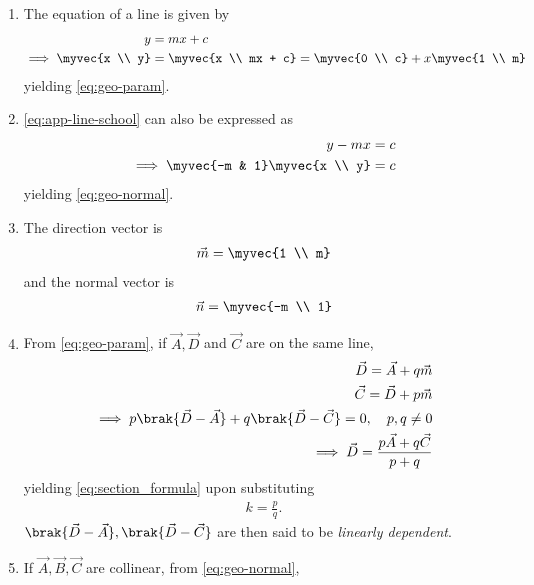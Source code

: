 \begin{enumerate}[label=\thesection.\arabic*.,ref=\thesection.\theenumi]
\item The equation of a line is given by 
\begin{align}
			\label{eq:app-line-school}
	y &= mx + c
	\\
	\implies \myvec{x \\ y} &= \myvec{x \\ 
	 mx + c} =\myvec{0 \\ c} + x\myvec{1 \\ m}
\end{align}
			yielding \eqref{eq:geo-param}.
\item 			\eqref{eq:app-line-school} can also be expressed as
\begin{align}
	y - mx &= c 
	\\
	\implies \myvec{-m & 1}\myvec{x \\ y} &= c
\end{align}
			yielding \eqref{eq:geo-normal}.
		\item The direction vector is 
\begin{align}
			\label{eq:app-line-school-dir}
\vec{m} = \myvec{1 \\ m}
\end{align}
and the normal vector is
\begin{align}
\vec{n}=\myvec{-m \\ 1}
			\label{eq:app-line-school-normal}
\end{align}
  \item From \eqref{eq:geo-param}, 
	  if $\vec{A},\vec{D}$ and $\vec{C}$ are on the same line,
		\label{prop:app-lin-dep}
\begin{align}
			\vec{D}=\vec{A}+q\vec{m} 
			\\ 
			\vec{C}=\vec{D}+p\vec{m} \\
			\label{eq:app-collinear} 
			\implies 	p\brak{\vec{D}-\vec{A}} 
			+ q\brak{\vec{D}-\vec{C}} = 0, \quad p, q \ne 0 \\ 
			\implies \vec{D} = \frac{p\vec{A}+q\vec{C}}{p+q} 
			\end{align} 
			yielding \eqref{eq:section_formula} upon substituting \begin{align} k = \frac{p}{q}. \end{align} 
			$\brak{\vec{D}-\vec{A}}, \brak{\vec{D}-\vec{C}}$ 
		are then said to be {\em linearly dependent}.
	\item If $\vec{A}, \vec{B}, \vec{C}$ are collinear,  from \eqref{eq:geo-normal}, \begin{align}

\end{align}
\end{enumerate}
